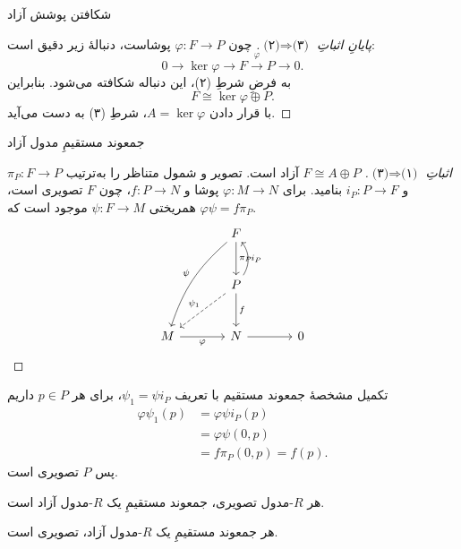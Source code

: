 \begin{frame}[t]{شکافتن پوشش آزاد}
\label{lec17:split-free-cover}
\begin{proof}[پایانِ اثباتِ $\text{(۲)}\Rightarrow\text{(۳)}$]
چون $\varphi:F\to P$ پوشاست، دنبالهٔ زیر دقیق است:
\[
0\longrightarrow\ker\varphi\longrightarrow F
\xrightarrow{\varphi}P\longrightarrow0.
\]
به فرضِ شرطِ (۲)، این دنباله شکافته می‌شود. بنابراین
\[
F\cong\ker\varphi\oplus P.
\]
با قرار دادن $A=\ker\varphi$، شرطِ (۳) به دست می‌آید.
\end{proof}
\end{frame}

\begin{frame}[t]{جمعوند مستقیمِ مدول آزاد}
\label{lec17:summand-implies-projective}
\begin{proof}[اثباتِ $\text{(۳)}\Rightarrow\text{(۱)}$]
$F\cong A\oplus P$ آزاد است. تصویر و شمول متناظر را به‌ترتیب
$\pi_P:F\to P$ و $i_P:P\to F$ بنامید.
برای $\varphi:M\to N$ پوشا و $f:P\to N$، چون $F$ تصویری است،
همریختی $\psi:F\to M$ موجود است که $\varphi\psi=f\pi_P$.
\[
\begin{tikzcd}[ampersand replacement=\&,column sep=large,row sep=large]
\&F\arrow[d,"\pi_P"]\arrow[ddl,bend right=15,"\psi"']\&\\
\&P\arrow[u,bend right=35,"i_P"']\arrow[d,"f"]\arrow[dl,dashed,"\psi_1"']\&\\
M\arrow[r,"\varphi"']\&N\arrow[r]\&0
\end{tikzcd}
\]
\end{proof}
\end{frame}

\begin{frame}[t]{تکمیل مشخصهٔ جمعوند مستقیم}
\label{lec17:summand-proof-conclusion}
با تعریف $\psi_1=\psi i_P$، برای هر $p\in P$ داریم
\[
\begin{aligned}
\varphi\psi_1(p)
&=\varphi\psi i_P(p)\\
&=\varphi\psi(0,p)\\
&=f\pi_P(0,p)=f(p).
\end{aligned}
\]
پس $P$ تصویری است.
\begin{corollary}
هر $R$-مدول تصویری، جمعوند مستقیمِ یک $R$-مدول آزاد است.
\end{corollary}
\begin{corollary}
هر جمعوند مستقیمِ یک $R$-مدول آزاد، تصویری است.
\end{corollary}
\end{frame}

